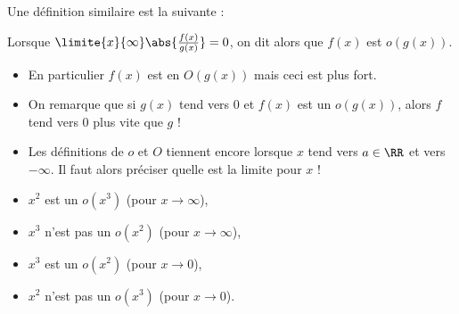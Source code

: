 \begin{frame}%
  Une définition similaire est la suivante :
  \begin{definition}
    Lorsque \(\limite{x}{\infty} \abs{\frac{f(x)}{g(x)}} = 0\), on dit alors que \(f(x)\) est \(o(g(x))\).
  \end{definition}
  \begin{remark}
    \begin{itemize}[<+->]
    \item En particulier \(f(x)\) est en \(O(g(x))\) mais ceci est plus fort.
    \item On remarque que si \(g(x)\) tend vers \(0\) et \(f(x)\) est un \(o(g(x))\), alors \(f\) tend vers \(0\) plus vite que \(g\) !
    \item Les définitions de \(o\) et \(O\) tiennent encore lorsque \(x\) tend vers \(a \in \RR\) et vers \(-\infty\). Il faut alors préciser quelle est la limite pour \(x\) !
  \end{itemize}
  \end{remark}
  \begin{example}
    \begin{itemize}[<+->]
    \item \(x^{2}\) est un \(o(x^{3})\) (pour \(x \to \infty\)),
    \item \(x^{3}\)  n'est pas un \(o(x^{2})\) (pour \(x \to \infty\)),
    \item \(x^{3}\) est un \(o(x^{2})\) (pour \(x \to 0\)),
    \item \(x^{2}\)  n'est pas un \(o(x^{3})\) (pour \(x \to 0\)).
  \end{itemize}

  \end{example}
\end{frame}

